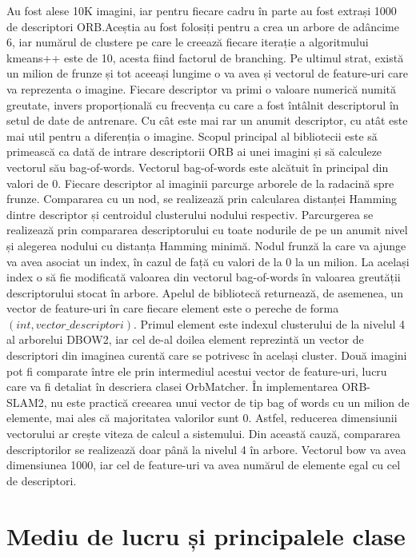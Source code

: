 \documentclass[12pt,a4paper]{report}
\begin{document}
Au fost alese 10K imagini, iar pentru fiecare cadru în parte au fost extrași 1000 de descriptori ORB.\@ Aceștia au 
fost folosiți pentru a crea un arbore de adâncime 6, iar numărul de clustere pe care le creează fiecare 
iterație a algoritmului kmeans++ este de 10, acesta fiind factorul de branching. Pe ultimul strat, există un milion 
de frunze și tot aceeași lungime o va avea și vectorul de feature-uri care va reprezenta o imagine. Fiecare
descriptor va primi o valoare numerică numită greutate, invers proporțională cu frecvența cu care a fost 
întâlnit descriptorul în setul de date de antrenare. Cu cât este mai rar un anumit descriptor, cu atât este
mai util pentru a diferenția o imagine. Scopul principal al bibliotecii este să primească ca dată
de intrare descriptorii ORB ai unei imagini și să calculeze vectorul său bag-of-words.
Vectorul bag-of-words este alcătuit în principal din valori de 0. Fiecare descriptor al 
imaginii parcurge arborele de la radacină spre frunze. Compararea cu un nod, se realizează 
prin calcularea distanței Hamming dintre descriptor și centroidul clusterului nodului respectiv.
Parcurgerea se realizează prin compararea descriptorului cu toate nodurile de pe un anumit nivel
și alegerea nodului cu distanța Hamming minimă. Nodul frunză la care va ajunge va avea asociat
un index, în cazul de față cu valori de la 0 la un milion. La același index o să fie modificată
valoarea din vectorul bag-of-words în valoarea greutății descriptorului stocat în arbore.
Apelul de bibliotecă returnează, de asemenea, un vector de feature-uri în care fiecare element
este o pereche de forma $ (int, vector\_descriptori) $. Primul element este indexul 
clusterului de la nivelul 4 al arborelui DBOW2, iar cel de-al doilea element reprezintă un 
vector de descriptori din imaginea curentă care se potrivesc în același cluster. Două imagini pot
fi comparate între ele prin intermediul acestui vector de feature-uri, lucru care va fi detaliat
în descriera clasei OrbMatcher. În implementarea ORB-SLAM2, nu este practică creearea unui vector
de tip bag of words cu un milion de elemente, mai ales că majoritatea valorilor sunt 0. Astfel,
reducerea dimensiunii vectorului ar crește viteza de calcul a sistemului. Din această 
cauză, compararea descriptorilor se realizează doar până la nivelul 4 în arbore. Vectorul bow 
va avea dimensiunea 1000, iar cel de feature-uri va avea numărul de elemente egal cu cel de 
descriptori. 

\section{Mediu de lucru și principalele clase}
\end{document}
